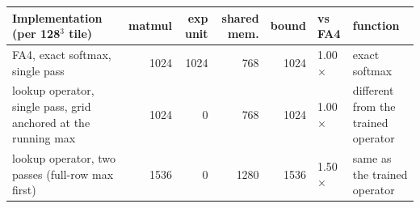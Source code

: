 \begin{tabular}{@{}p{4.3cm}rrrrlp{2.6cm}@{}}
\toprule
Implementation (per 128$^3$ tile) & matmul & exp unit & shared mem. & bound & vs FA4 & function \\
\midrule
FA4, exact softmax, single pass & 1024 & 1024 & 768 & 1024 & 1.00$\times$ & exact softmax \\
lookup operator, single pass, grid anchored at the running max & 1024 & 0 & 768 & 1024 & 1.00$\times$ & different from the trained operator \\
lookup operator, two passes (full-row max first) & 1536 & 0 & 1280 & 1536 & 1.50$\times$ & same as the trained operator \\
\bottomrule
\end{tabular}
